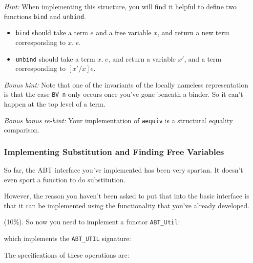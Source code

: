 \documentclass[11pt]{article}
\newcounter{taskcounter}
\newcounter{taskPercentCounter}
\newcommand{\task}[1]
  {\bigskip \noindent {\bf Task\addtocounter{taskPercentCounter}{#1} \arabic{taskcounter}\addtocounter{taskcounter}{1}} (#1\%).}
\begin{document}
\emph{Hint:} When implementing this structure, you will find it
helpful to define two functions \texttt{bind} and \texttt{unbind}.

\begin{itemize}
\item \texttt{bind} should take a term $e$ and a free variable $x$,
and return a new term corresponding to $x.\;e$.

\item \texttt{unbind} should take a term $x.\;e$, and return a
variable $x'$, and a term corresponding to $[x'/x]e$.
\end{itemize}

\emph{Bonus hint:} Note that one of the invariants of the locally
nameless representation is that the case \texttt{BV n} only occurs
once you've gone beneath a binder. So it can't happen at the top
level of a term.

\emph{Bonus bonus re-hint:} Your implementation of \texttt{aequiv} is a
structural equality comparison.


\subsubsection{Implementing Substitution and Finding Free Variables}

So far, the ABT interface you've implemented has been very spartan.
It doesn't even sport a function to do substitution.

However, the reason you haven't been asked to put that into the basic
interface is that it can be implemented using the functionality that
you've already developed.

\task{10} So now you need to implement a functor
\texttt{ABT\_Util}:


\noindent
which implements the \texttt{ABT\_UTIL} signature:



The specifications of these operations are:
\end{document}
